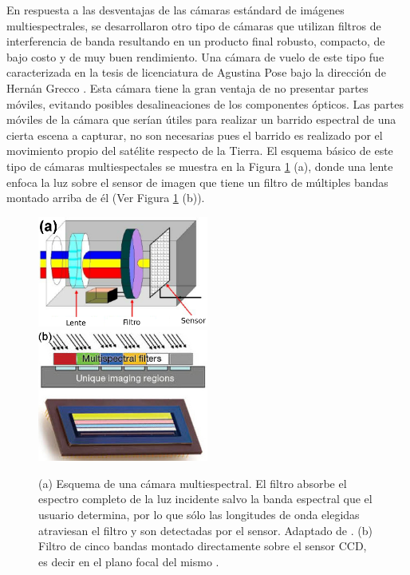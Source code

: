En respuesta a las desventajas de las cámaras estándard de imágenes multiespectrales, se desarrollaron otro tipo de cámaras que utilizan filtros de interferencia de banda resultando en un producto final robusto, compacto, 
de bajo costo y de muy buen rendimiento. Una cámara de vuelo de este tipo fue caracterizada en la tesis de licenciatura de Agustina Pose bajo la dirección de Hernán Grecco \cite{Pose2017}. 
Esta cámara tiene la gran ventaja de no presentar partes móviles, 
evitando posibles desalineaciones de los componentes ópticos. Las partes 
móviles de la cámara que serían útiles para realizar un barrido espectral de 
una cierta escena a capturar, no son necesarias pues el barrido es realizado 
por el movimiento propio del satélite respecto de la Tierra. El esquema básico 
de este tipo de 
cámaras multiespectales se muestra 
en la Figura \ref{fig:esquemcamypegfilt} (a), donde una lente enfoca la luz sobre el sensor de imagen que tiene un filtro de múltiples bandas montado arriba de él (Ver Figura \ref{fig:esquemcamypegfilt} (b)).


\begin{figure}[H]
\centering
\includegraphics[width=0.5\textwidth]{Figs/plan_de_tesis/cam_sens.png}\hfill
\includegraphics[width=0.5\textwidth]{Figs/introduccion/teled.png}
\caption{(a) Esquema de una cámara multiespectral. El filtro absorbe el espectro completo de la luz incidente salvo la banda espectral que el usuario determina, por lo que sólo las longitudes de onda elegidas atraviesan el filtro y son detectadas por el sensor. Adaptado de \cite{Martinez2008}. (b) Filtro de cinco bandas montado directamente sobre el sensor CCD, es decir en el plano focal del mismo \cite{sensarrib}.}
\label{fig:esquemcamypegfilt}
\end{figure}

